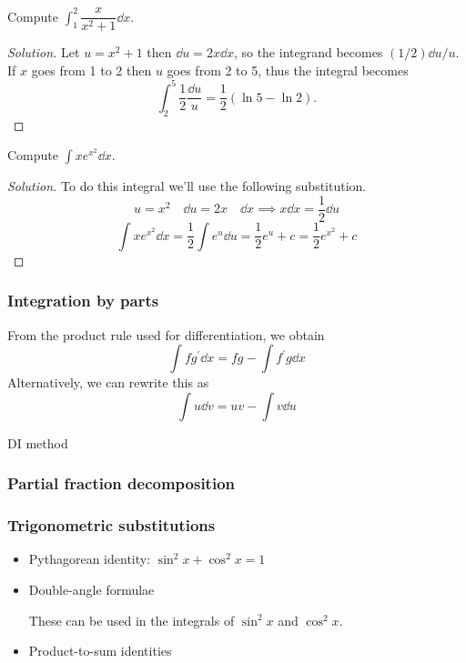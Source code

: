 \begin{exmp}{}{}
Compute $\int_1^2\dfrac{x}{x^2+1}\dd{x}$.
\end{exmp}
\begin{proof}[Solution]
Let $u=x^2+1$ then $\dd{u} = 2x \dd{x}$, so the integrand becomes $(1/2)\dd{u}/u$. If $x$ goes
from 1 to 2 then $u$ goes from 2 to 5, thus the integral becomes
\[ \int_2^5\frac{1}{2}\frac{\dd{u}}{u} = \frac{1}{2}(\ln5-\ln2). \]
\end{proof}

\begin{exmp}{}{}
Compute $\int xe^{x^2}\dd{x}$.
\end{exmp}
\begin{proof}[Solution]
To do this integral we'll use the following substitution.
\[ u = x^2 \quad \dd{u} = 2x \quad \dd{x} \implies x \dd{x} = \frac{1}{2} \dd{u} \]
\[ \int x e^{x^2} \dd{x} = \frac{1}{2}\int e^u \dd{u} = \frac{1}{2}e^u + c = \frac{1}{2}e^{x^2} + c \]
\end{proof}



\subsubsection{Integration by parts}
From the product rule used for differentiation, we obtain
\begin{equation}
\int f g^\prime \dd{x} = fg - \int f^\prime g \dd{x}
\end{equation}
Alternatively, we can rewrite this as 
\begin{equation}
\int u \dd{v} = uv - \int v \dd{u}
\end{equation}

DI method

\subsubsection{Partial fraction decomposition}

\subsubsection{Trigonometric substitutions}
\begin{itemize}
\item Pythagorean identity: $\sin^2x + \cos^2x = 1$

\item Double-angle formulae

These can be used in the integrals of $\sin^2x$ and $\cos^2x$.

\item Product-to-sum identities
\end{itemize}

